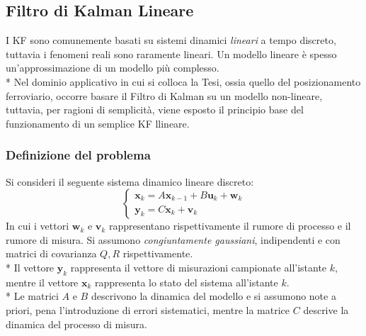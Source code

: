 \subsection{Filtro di Kalman Lineare}
I KF sono comunemente basati su sistemi dinamici \emph{lineari} a tempo discreto, tuttavia i fenomeni reali sono raramente lineari. Un modello lineare \`e spesso un'approssimazione di un modello pi\`u complesso.\\*
Nel dominio applicativo in cui si colloca la Tesi, ossia quello del posizionamento ferroviario, occorre basare il Filtro di Kalman su un modello non-lineare, tuttavia, per ragioni di semplicit\`a, viene esposto il principio base del funzionamento di un semplice KF llineare.
\subsubsection{Definizione del problema}
Si consideri il seguente sistema dinamico lineare discreto:
$$
\begin{cases}
\mathbf x_k = A \mathbf x_{k-1} + B \mathbf u_k + \mathbf w_k \\
\mathbf y_k = C \mathbf x_k + \mathbf v_k
\end{cases}
$$
In cui i vettori $\mathbf w_k$ e $\mathbf v_k$ rappresentano rispettivamente il rumore di processo e il rumore di misura. Si assumono \emph{congiuntamente gaussiani}, indipendenti e con matrici di covarianza $Q,R$ rispettivamente.\\*
Il vettore $\mathbf y_k$ rappresenta il vettore di misurazioni campionate all'istante $k$, mentre il vettore $\mathbf x_k$ rappresenta lo stato del sistema all'istante $k$.\\*
Le matrici $A$ e $B$ descrivono la dinamica del modello e si assumono note a priori, pena l'introduzione di errori sistematici, mentre la matrice $C$ descrive la dinamica del processo di misura.